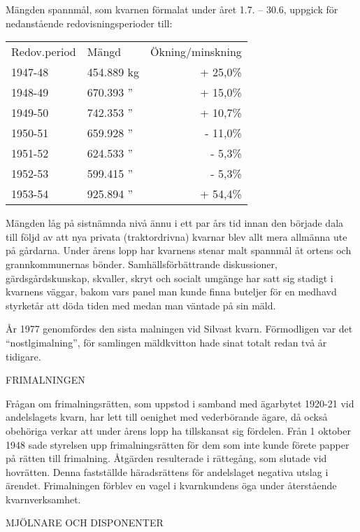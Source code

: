 Mängden spannmål, som kvarnen förmalat under året 1.7. – 30.6, uppgick för nedanstående redovisningsperioder till:
\begin{center}
  \begin{tabular}{l l r}
    \hline
    Redov.period & Mängd & Ökning/minskning \\
    1947-48	&	454.889 kg & + 25,0\% \\
    1948-49	&	670.393 '' & + 15,0\% \\
    1949-50	&	742.353 '' & + 10,7\% \\
    1950-51	&	659.928 '' & - 11,0\% \\
    1951-52	&	624.533 '' & -  5,3\% \\
    1952-53	&	599.415 '' & -  5,3\% \\
    1953-54	&	925.894 '' & + 54,4\% \\
    \hline
  \end{tabular}
\end{center}

Mängden låg på sistnämnda nivå ännu i ett par års tid innan den började dala till följd av att nya privata (traktordrivna) kvarnar blev allt mera allmänna ute på gårdarna. Under årens lopp har kvarnens stenar malt spannmål åt ortens och grannkommunernas bönder. Samhällsförbättrande diskussioner, gärdsgårdskunskap, skvaller, skryt och socialt umgänge har satt sig stadigt i kvarnens väggar, bakom vars panel man kunde finna buteljer för en medhavd styrketår att döda tiden med medan man väntade på sin mäld.

År 1977 genomfördes den sista malningen vid Silvast kvarn. Förmodligen var det ``nostlgimalning'', för samlingen mäldkvitton hade sinat totalt redan två år tidigare.


FRIMALNINGEN

Frågan om frimalningsrätten, som uppstod i samband med ägarbytet 1920-21 vid andelslagets kvarn, har lett till oenighet med vederbörande ägare, då också obehöriga verkar att under årens lopp ha tillskansat sig fördelen. Från 1 oktober 1948 sade styrelsen upp frimalningsrätten för dem som inte kunde förete papper på rätten till frimalning. Åtgärden resulterade i rättegång, som slutade vid hovrätten. Denna fastställde häradsrättens för andelslaget negativa utslag i ärendet. Frimalningen förblev en vagel i kvarnkundens öga under återstående kvarnverksamhet.


MJÖLNARE OCH DISPONENTER

